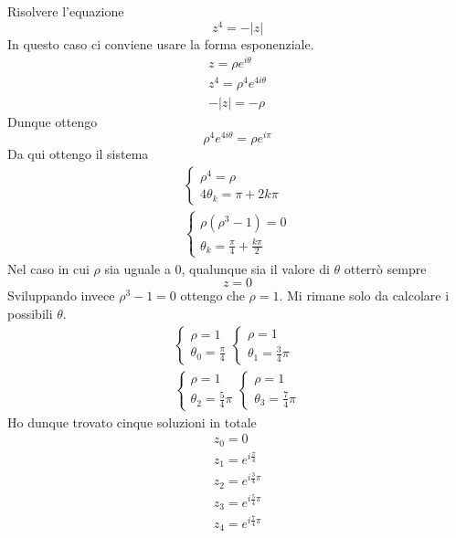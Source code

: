 \begin{example}
	Risolvere l'equazione
	\begin{equation*}
		z^4 = - |z|
	\end{equation*}
	In questo caso ci conviene usare la forma esponenziale.
	\begin{gather*}
		z = \rho e^{i \theta} \\
		z^4 = \rho^4 e^{4 i \theta} \\
		-|z| = -\rho
	\end{gather*}
	Dunque ottengo
	\begin{equation*}
		\rho^4 e^{4 i \theta} = \rho e^{i \pi}
	\end{equation*}
	Da qui ottengo il sistema
	\begin{gather*}
		\begin{cases}
			\rho^4 = \rho \\
			4 \theta_k = \pi + 2k \pi
		\end{cases} \\
		\begin{cases}
			\rho (\rho^3 - 1) = 0 \\
			\theta_k = \frac{\pi}{4} + \frac{k \pi}{2}
		\end{cases}
	\end{gather*}
	Nel caso in cui $\rho$ sia uguale a 0, qualunque sia il valore di $\theta$ otterr\`o sempre
	\begin{equation*}
		z = 0
	\end{equation*}
	Sviluppando invece $\rho^3 - 1 = 0$ ottengo che $\rho = 1$. Mi rimane solo da calcolare
	i possibili $\theta$.
	\begin{gather*}
		\begin{cases}
			\rho = 1 \\
			\theta_0 = \frac{\pi}{4}
		\end{cases}
		\begin{cases}
			\rho = 1 \\
			\theta_1 = \frac{3}{4} \pi
		\end{cases} \\
		\begin{cases}
			\rho = 1 \\
			\theta_2 = \frac{5}{4} \pi
		\end{cases}
		\begin{cases}
			\rho = 1 \\
			\theta_3 = \frac{7}{4} \pi
		\end{cases}
	\end{gather*}
	Ho dunque trovato cinque soluzioni in totale
	\begin{gather*}
		z_0 = 0 \\
		z_1 = e^{i \frac{\pi}{4}} \\
		z_2 = e^{i \frac{3}{4} \pi} \\
		z_3 = e^{i \frac{5}{4} \pi} \\
		z_4 = e^{i \frac{7}{4} \pi}
	\end{gather*}
\end{example}
